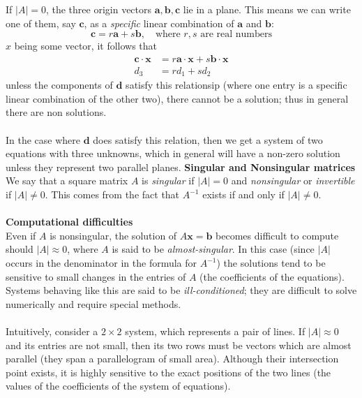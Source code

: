\documentclass{report}
\begin{document}
If $|A|=0$, the three origin vectors $\mathbf{a,b,c}$ lie in a plane. This means we 
can write one of them, say $\mathbf{c}$, as a \textit{specific} linear combination 
of $\mathbf{a}$ and $\mathbf{b}$:
\begin{equation*}
\mathbf{c}=r\mathbf{a}+s\mathbf{b},\quad\text{where $r,s$ are real numbers}
\end{equation*}
$x$ being some vector, it follows that
\begin{align*}
\mathbf{c\cdot x}&=r\mathbf{a\cdot x}+s\mathbf{b\cdot x}\\
d_3&=rd_1+sd_2
\end{align*}
unless the components of $\mathbf{d}$ satisfy this relationsip (where one entry is 
a specific linear combination of the other two), there cannot be a solution; thus in general 
there are non solutions.\\
\vspace{1mm}\\
In the case where $\mathbf{d}$ does satisfy this relation, then we get a system of 
two equations with three unknowns, which in general will have a non-zero solution 
unless they represent two parallel planes.
\newpage
\noindent\textbf{Singular and Nonsingular matrices}\\
We say that a square matrix $A$ is \textit{singular} if $|A|=0$ and \textit{nonsingular} 
or \textit{invertible} if $|A|\neq0$. This comes from the fact that $A^{-1}$ exists
if and only if $|A|\neq0$.\\
\vspace{1mm}\\
\textbf{Computational difficulties}\\
Even if $A$ is nonsingular, the solution of $A\mathbf{x=b}$ becomes difficult to 
compute should $|A|\approx0$, where $A$ is said to be \textit{almost-singular}. 
In this case (since $|A|$ occurs in the denominator in the formula for
$A^{-1}$) the solutions tend to be sensitive to small changes in the entries of $A$ 
(the coefficients of the equations). 
Systems behaving like this are said to be \textit{ill-conditioned}; they are difficult 
to solve numerically and require special methods.\\
\vspace{1mm}\\
Intuitively, consider a $2\times2$ system, which represents a pair of lines. 
If $|A|\approx0$ and its entries are not small, then its two rows must be vectors which
are almost parallel (they span a parallelogram of small area). 
Although their intersection point exists, it is highly sensitive to the exact positions of the 
two lines (the values of the coefficients of the system of equations).
\newpage
\end{document}
